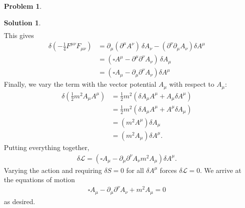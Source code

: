 \documentclass[a4paper,11pt]{article}
\numberwithin{equation}{section}
\theoremstyle{definition}
\newtheorem{prob}{Problem}[section]
\newtheorem{sln}{Solution}[section]
\newcommand{\p}{\partial}
\newcommand{\lag}{\mathcal{L}}
\begin{document}
\begin{prob}
\begin{sln}
\begin{align}
		\end{align}
		This gives
		\begin{align}
		\delta\left(-\frac{1}{4}F^{\mu\nu}F_{\mu\nu} \right) &= \partial_\mu(\partial^\mu A^\nu)\,\delta A_\nu - (\partial^\nu\partial_\mu A_\nu)\delta A^\mu\\ 
		&= \left(\square A^\mu - \p^\mu\p^\nu A_\nu \right)\,\delta A_\mu\\
		&= \left(\square A_\mu - \p_\mu \p^\nu A_\nu \right)\delta A^\mu
		\end{align}
		Finally, we vary the term with the vector potential $A_\mu$ with respect to $A_\mu$:
		\begin{align}
		\delta \left(\frac{1}{2}m^2 A_\mu A^\mu  \right) &= \frac{1}{2}m^2 \left( \delta A_\mu A^\mu + A_\mu \delta A^\mu \right)\\
		&=  \frac{1}{2}m^2 \left( \delta A_\mu A^\mu + A^\mu \delta A_\mu \right)\\
		&= \left(m^2 A^\mu\right)\delta A_\mu \\
		&= \left(m^2 A_\mu\right)\delta A^\mu.
		\end{align}
		Putting everything together, 
		\begin{align}
		\delta \lag = \left(\square A_\mu - \p_\mu \p^\nu A_\nu m^2A_\mu \right)\delta A^\mu.
		\end{align}
		Varying the action and requiring $\delta S = 0$ for all $\delta A^\mu$ forces $\delta \lag =0$. We arrive at the equations of motion
		\begin{align}
		\square A_\mu - \p_\mu \p^\nu A_\nu +  m^2A_\mu = 0
		\end{align}
		as desired.\\
	\end{sln}
\end{prob}

\newpage
\end{document}
